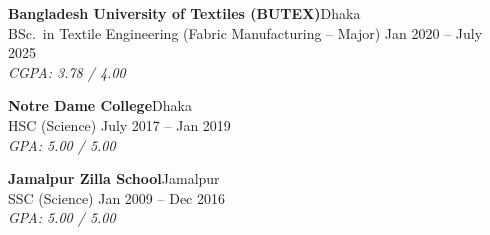 

      \textbf{Bangladesh University of Textiles (BUTEX)}\hfill Dhaka\\
      \vspace{1mm}
      BSc.\ in Textile Engineering (Fabric Manufacturing – Major) \hfill Jan 2020 – July 2025\\
      \vspace{1mm}
      \textit{CGPA\@: 3.78 / 4.00}
      \vspace{3mm}

      \textbf{Notre Dame College}\hfill Dhaka\\
      \vspace{1mm}
      HSC (Science) \hfill July 2017 – Jan 2019\\
       \vspace{1mm}
       \textit{GPA\@: 5.00 / 5.00}
       \vspace{3mm}

      \textbf{Jamalpur Zilla School}\hfill Jamalpur\\
      \vspace{1mm}
       SSC (Science) \hfill Jan 2009 – Dec 2016\\
      \vspace{1mm}
      \textit{GPA\@: 5.00 / 5.00}
